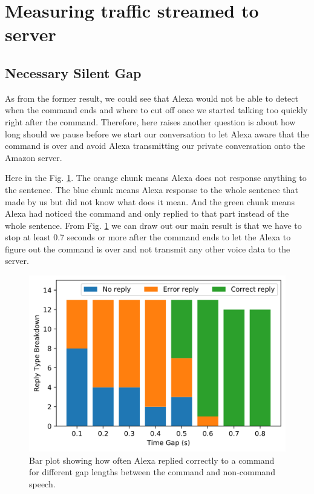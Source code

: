 \section{Measuring traffic streamed to server}

\subsection{Necessary Silent Gap}

As from the former result, we could see that Alexa would not be able to detect when the command ends and where to cut off once we started talking too quickly right after the command. Therefore, here raises another question is about how long should we pause before we start our conversation to let Alexa aware that the command is over and avoid Alexa transmitting our private conversation onto the Amazon server.

Here in the Fig. \ref{fig:gap}. The orange chunk means Alexa does not response anything to the sentence. The blue chunk means Alexa response to the whole sentence that made by us but did not know what does it mean. And the green chunk means Alexa had noticed the command and only replied to that part instead of the whole sentence. From Fig. \ref{fig:gap} we can draw out our main result is that we have to stop at least 0.7 seconds or more after the command ends to let the Alexa to figure out the command is over and not transmit any other voice data to the server.

\begin{figure}[ht]
	\centering
	\includegraphics[scale=0.4]{../measurement/results/1207night/reply_type_breakdown}
	\caption{Bar plot showing how often Alexa replied correctly to a command for different gap lengths between the command and non-command speech.}
	\label{fig:gap}
	\vspace{-3mm}
	\end{figure}

